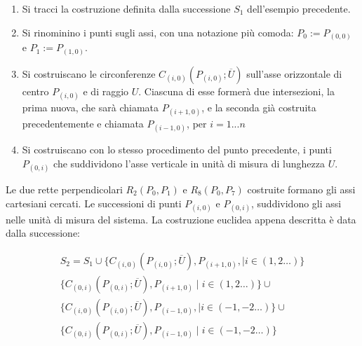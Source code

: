 \begin{enumerate}

\item Si tracci la costruzione definita dalla successione $S_{1}$ dell'esempio precedente. 

\item Si rinominino i punti sugli assi, con una notazione più comoda: $P_{0} := P_{(0,0)}$ e $P_{1} := P_{(1,0)}$.

\item Si costruiscano le circonferenze $C_{(i,0)}(P_{(i,0)};\overline{U})$ sull'asse orizzontale di centro $P_{(i,0)}$ e di raggio $U$. Ciascuna di esse formerà due intersezioni, la prima nuova, che sarà chiamata $P_{(i+1,0)}$, e la seconda già costruita precedentemente e chiamata $P_{(i-1,0)}$, per $i = 1 ... n$

\item Si costruiscano con lo stesso procedimento del punto precedente, i punti $P_{(0,i)}$ che suddividono l'asse verticale in unità di misura di lunghezza $U$.

\end{enumerate}

\noindent
Le due rette perpendicolari $R_{2}(P_{0}, P_{1})$ e $R_{8}(P_{0}, P_{7})$ costruite formano gli assi cartesiani cercati. Le successioni di punti $P_{(i,0)}$ e $P_{(0,i)}$, suddividono gli assi nelle unità di misura del sistema.  
La costruzione euclidea appena descritta è data dalla successione:


\begin{align*}
S_{2} = S_{1} \cup \{C_{(i,0)}(P_{(i,0)};\overline{U}), P_{(i+1,0)}, \mid  i \in (1,2\dots) \}  \\
 \{C_{(0,i)}(P_{(0,i)};\overline{U}), P_{(i+1,0)} \mid   i \in (1,2\dots) \} \cup \\
  \{C_{(i,0)}(P_{(i,0)};\overline{U}), P_{(i-1,0)}, \mid  i \in (-1,-2\dots) \}  \cup  \\
  \{C_{(0,i)}(P_{(0,i)};\overline{U}), P_{(i-1,0)} \mid  i \in (-1,-2\dots) \} 
\end{align*}



